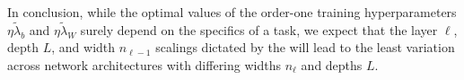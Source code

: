 In conclusion, while the optimal values of the order-one training hyperparameters $\eta\widetilde{\lambda}_{b}$ and $\eta\widetilde{\lambda}_{W}$ surely depend on the specifics of a task, we expect that the layer $\ell$, depth $L$, and width  $n_{\ell-1}$ scalings dictated by the  will lead to the least variation across network architectures with differing widths $n_\ell$ and depths $L$.















































